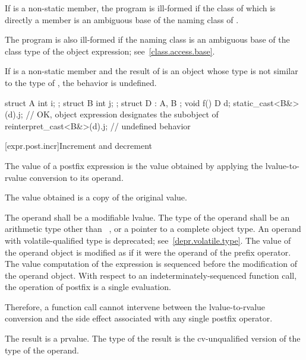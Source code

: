 \pnum
If  is a non-static member,
the program is ill-formed if the class of which  is
directly a member is an ambiguous base of
the naming class of .
\begin{note}
The program is also ill-formed if the naming class is an ambiguous base of the class type
of the object expression; see~\ref{class.access.base}.
\end{note}

\pnum
If  is a non-static member and
the result of  is an object whose type
is not similar to the type of ,
the behavior is undefined.
\begin{example}
\begin{codeblock}
struct A { int i; };
struct B { int j; };
struct D : A, B {};
void f() {
  D d;
  static_cast<B&>(d).j;             // OK, object expression designates the  subobject of 
  reinterpret_cast<B&>(d).j;        // undefined behavior
}
\end{codeblock}
\end{example}

[expr.post.incr]{Increment and decrement}

\pnum
{}%
%
%
%
The value of a postfix \tcode{++} expression is the value obtained by
applying the lvalue-to-rvalue conversion to its operand.
\begin{note}
The value obtained is a copy of the original value.
\end{note}
The operand shall be a modifiable lvalue. The type of the operand shall
be an arithmetic type other than \cv{}~,
or a pointer to a complete object type.
An operand with volatile-qualified type is deprecated;
see~\ref{depr.volatile.type}.
The value of the operand object is modified
as if it were the operand of the prefix \tcode{++} operator.
The
%
value computation of the \tcode{++} expression is sequenced before the
modification of the operand object. With respect to an
indeterminately-sequenced function call, the operation of postfix
\tcode{++} is
a single evaluation.
\begin{note}
Therefore, a function call cannot intervene between the
lvalue-to-rvalue conversion and the side effect associated with any
single postfix \tcode{++} operator.
\end{note}
The result is a prvalue. The type of the result is the cv-unqualified
version of the type of the operand.

